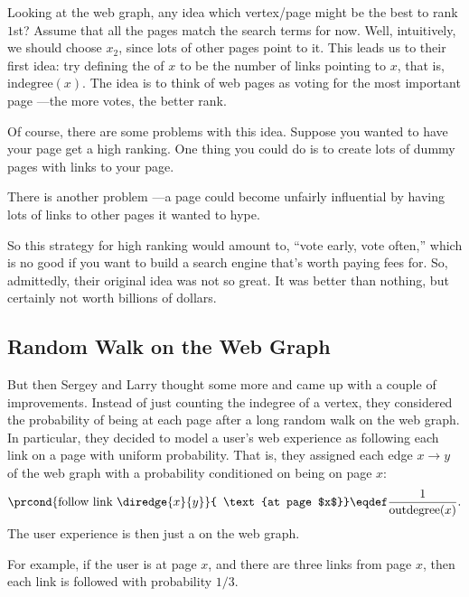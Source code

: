 \begin{example}
Looking at the web graph, any idea which vertex/page might be the best to
rank $1$st?  Assume that all the pages match the search terms for now.
Well, intuitively, we should choose $x_2$, since lots of other pages point
to it.  This leads us to their first idea: try defining the  of $x$ to be the number of links pointing to $x$, that is,
$\text{indegree}(x)$.  The idea is to think of web pages as voting for the
most important page ---the more votes, the better rank.

Of course, there are some problems with this idea.  Suppose you wanted
to have your page get a high ranking.  One thing you could do is to
create lots of dummy pages with links to your page.


There is another problem ---a page could become unfairly influential by
having lots of links to other pages it wanted to hype.


So this strategy for high ranking would amount to, ``vote early, vote
often,'' which is no good if you want to build a search engine that's
worth paying fees for.  So, admittedly, their original idea was not so
great.  It was better than nothing, but certainly not worth billions of
dollars.

\subsection{Random Walk on the Web Graph}

But then Sergey and Larry thought some more and came up with a couple of
improvements.  Instead of just counting the indegree of a vertex, they
considered the probability of being at each page after a long random walk
on the web graph.  In particular, they decided to model a user's web
experience as following each link on a page with uniform probability.
That is, they assigned each edge $x \rightarrow y$ of the web graph with a
probability conditioned on being on page $x$:
\[
\prcond{\text{follow link}\ \diredge{x}{y}}{ \text{at page $x$}} \eqdef
\frac{1}{\text{outdegree}(x)}.
\]
The user experience is then just a  on the web graph.

For example, if the user is at page $x$, and there are three links from
page $x$, then each link is followed with probability $1/3$.


\end{example}
